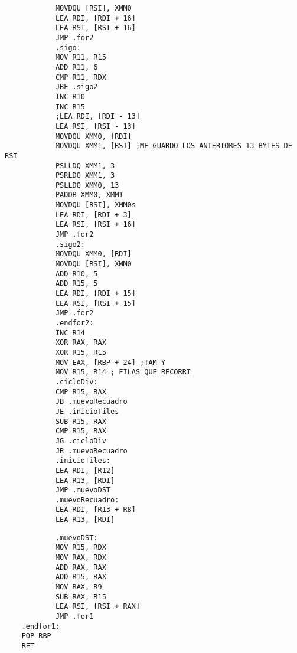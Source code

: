 \begin{codesnippet}
\begin{verbatim}
			MOVDQU [RSI], XMM0
			LEA RDI, [RDI + 16]
			LEA RSI, [RSI + 16]
			JMP .for2
			.sigo:
			MOV R11, R15
			ADD R11, 6
			CMP R11, RDX
			JBE .sigo2
			INC R10
			INC R15
			;LEA RDI, [RDI - 13]
			LEA RSI, [RSI - 13]
			MOVDQU XMM0, [RDI]
			MOVDQU XMM1, [RSI] ;ME GUARDO LOS ANTERIORES 13 BYTES DE RSI
			PSLLDQ XMM1, 3
			PSRLDQ XMM1, 3
			PSLLDQ XMM0, 13
			PADDB XMM0, XMM1
			MOVDQU [RSI], XMM0s
			LEA RDI, [RDI + 3]
			LEA RSI, [RSI + 16]
			JMP .for2
			.sigo2:
			MOVDQU XMM0, [RDI]
			MOVDQU [RSI], XMM0
			ADD R10, 5
			ADD R15, 5
			LEA RDI, [RDI + 15]
			LEA RSI, [RSI + 15]
			JMP .for2
			.endfor2:
			INC R14
			XOR RAX, RAX
			XOR R15, R15
			MOV EAX, [RBP + 24] ;TAM Y
			MOV R15, R14 ; FILAS QUE RECORRI
			.cicloDiv:
			CMP R15, RAX
			JB .muevoRecuadro
			JE .inicioTiles
			SUB R15, RAX
			CMP R15, RAX
			JG .cicloDiv
			JB .muevoRecuadro
			.inicioTiles:
			LEA RDI, [R12]
			LEA R13, [RDI]
			JMP .muevoDST
			.muevoRecuadro:
			LEA RDI, [R13 + R8]
			LEA R13, [RDI]
\end{verbatim}
\end{codesnippet}
\begin{codesnippet}
\begin{verbatim}
			.muevoDST:
			MOV R15, RDX
			MOV RAX, RDX
			ADD RAX, RAX
			ADD R15, RAX
			MOV RAX, R9
			SUB RAX, R15
			LEA RSI, [RSI + RAX]
			JMP .for1
	.endfor1:
	POP RBP
	RET
\end{verbatim}
\end{codesnippet}
